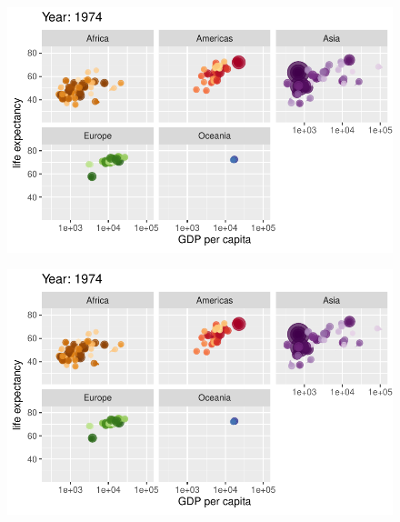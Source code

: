 \documentclass[
  letterpaper,
  DIV=11,
  numbers=noendperiod]{scrartcl}
\begin{document}
\begin{figure}[H]

{\centering \includegraphics{class05_files/figure-pdf/unnamed-chunk-24-40.pdf}

}

\end{figure}

\begin{figure}[H]

{\centering \includegraphics{class05_files/figure-pdf/unnamed-chunk-24-41.pdf}

}

\end{figure}
\end{document}
